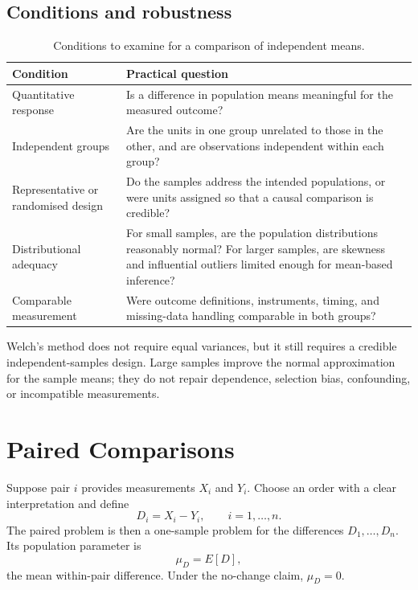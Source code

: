\subsection{Conditions and robustness}

\begin{table}[htbp]
\centering
\caption{Conditions to examine for a comparison of independent means.}
\label{tab:welch-conditions}
\begin{tabularx}{\textwidth}{@{}l>{\raggedright\arraybackslash}X@{}}
\toprule
Condition & Practical question \\
\midrule
Quantitative response & Is a difference in population means meaningful for the measured outcome? \\
Independent groups & Are the units in one group unrelated to those in the other, and are observations independent within each group? \\
Representative or randomised design & Do the samples address the intended populations, or were units assigned so that a causal comparison is credible? \\
Distributional adequacy & For small samples, are the population distributions reasonably normal? For larger samples, are skewness and influential outliers limited enough for mean-based inference? \\
Comparable measurement & Were outcome definitions, instruments, timing, and missing-data handling comparable in both groups? \\
\bottomrule
\end{tabularx}
\end{table}

Welch's method does not require equal variances, but it still requires a credible independent-samples design. Large samples improve the normal approximation for the sample means; they do not repair dependence, selection bias, confounding, or incompatible measurements.

\section{Paired Comparisons}
\label{sec:paired-comparisons}

Suppose pair $i$ provides measurements $X_i$ and $Y_i$. Choose an order with a clear interpretation and define
\[
D_i=X_i-Y_i,
\qquad i=1,\ldots,n.
\]
The paired problem is then a one-sample problem for the differences $D_1,\ldots,D_n$. Its population parameter is
\[
\mu_D=E[D],
\]
the mean within-pair difference. Under the no-change claim, $\mu_D=0$.

